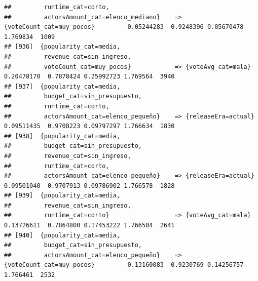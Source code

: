 \documentclass[
]{article}
\begin{document}
\begin{verbatim}
##         runtime_cat=corto,                                                                                                      
##         actorsAmount_cat=elenco_mediano}    => {voteCount_cat=muy_pocos}         0.05244283  0.9248396 0.05670478 1.769834  1009
## [936]  {popularity_cat=media,                                                                                                   
##         revenue_cat=sin_ingreso,                                                                                                
##         voteCount_cat=muy_pocos}            => {voteAvg_cat=mala}                0.20478170  0.7878424 0.25992723 1.769564  3940
## [937]  {popularity_cat=media,                                                                                                   
##         budget_cat=sin_presupuesto,                                                                                             
##         runtime_cat=corto,                                                                                                      
##         actorsAmount_cat=elenco_pequeño}    => {releaseEra=actual}               0.09511435  0.9708223 0.09797297 1.766634  1830
## [938]  {popularity_cat=media,                                                                                                   
##         budget_cat=sin_presupuesto,                                                                                             
##         revenue_cat=sin_ingreso,                                                                                                
##         runtime_cat=corto,                                                                                                      
##         actorsAmount_cat=elenco_pequeño}    => {releaseEra=actual}               0.09501040  0.9707913 0.09786902 1.766578  1828
## [939]  {popularity_cat=media,                                                                                                   
##         revenue_cat=sin_ingreso,                                                                                                
##         runtime_cat=corto}                  => {voteAvg_cat=mala}                0.13726611  0.7864800 0.17453222 1.766504  2641
## [940]  {popularity_cat=media,                                                                                                   
##         budget_cat=sin_presupuesto,                                                                                             
##         actorsAmount_cat=elenco_pequeño}    => {voteCount_cat=muy_pocos}         0.13160083  0.9230769 0.14256757 1.766461  2532

\end{verbatim}
\end{document}
